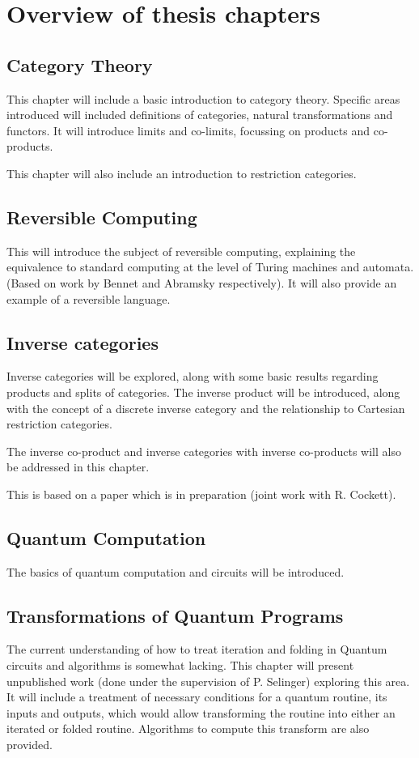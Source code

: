 \chapter*{Overview of thesis chapters}

\section*{Category Theory}

This chapter will include a basic introduction to category theory. Specific areas introduced will
included definitions of categories, natural transformations and functors. It will introduce limits
and co-limits, focussing on products and co-products.

This chapter will also include an introduction to restriction categories.

\section*{Reversible Computing}

This will introduce the subject of reversible computing, explaining the equivalence to standard
computing at the level of Turing machines and automata. (Based on work by Bennet and Abramsky
respectively). It will also provide an example of a reversible language.

\section*{Inverse categories}

Inverse categories will be explored, along with some basic results regarding products and splits of
categories. The inverse product will be introduced, along with the concept of a discrete inverse
category and the relationship to Cartesian restriction categories.

The inverse co-product and inverse categories with inverse co-products will also be addressed in
this chapter.

This is based on a paper which is in preparation (joint work with R. Cockett).

\section*{Quantum Computation}
The basics of quantum computation and circuits will be introduced.

\section*{Transformations of Quantum Programs}
The current understanding of how to treat iteration and folding in Quantum circuits and algorithms
is somewhat lacking. This chapter will present unpublished work (done under the supervision of P.
Selinger) exploring this area. It will include a treatment of necessary conditions for a quantum
routine, its inputs and outputs, which would allow transforming the routine into either an iterated
or folded routine. Algorithms to compute this transform are also provided.

